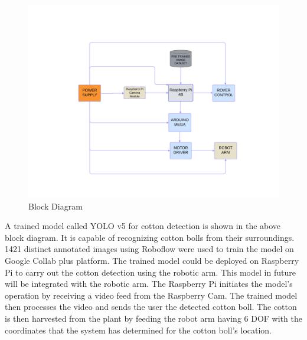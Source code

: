 \documentclass[12pt,a4paper]{report}
\begin{document}
\begin{figure}[!htb]
\begin{center}
\includegraphics[scale=0.5]{images/diagrams/blockdig.jpg}
\caption{Block Diagram}
\end{center}
\end{figure}
\newpage
\par A trained model called YOLO v5 for cotton detection is shown in the above block diagram. It is capable of recognizing cotton bolls from their surroundings. 1421 distinct annotated images using Roboflow were used to train the model on Google Collab plus platform. The trained model could be deployed on Raspberry Pi to carry out the cotton detection using the robotic arm. This model in future will be integrated with the robotic arm. The Raspberry Pi initiates the model's operation by receiving a video feed from the Raspberry Cam. The trained model then processes the video and sends the user the detected cotton boll. The cotton is then harvested from the plant by feeding the robot arm having 6 DOF with the coordinates that the system has determined for the cotton boll's location.

\end{document}
